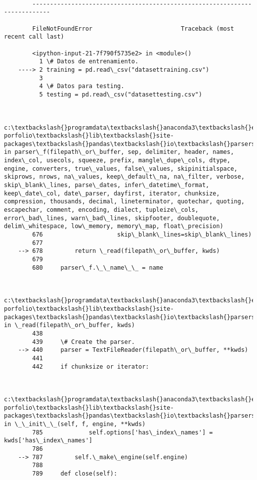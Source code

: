 \documentclass[11pt]{article}
\begin{document}
    \begin{Verbatim}[commandchars=\\\{\}]

        ---------------------------------------------------------------------------

        FileNotFoundError                         Traceback (most recent call last)

        <ipython-input-21-7f790f5735e2> in <module>()
          1 \# Datos de entrenamiento.
    ----> 2 training = pd.read\_csv("datasettraining.csv")
          3 
          4 \# Datos para testing.
          5 testing = pd.read\_csv("datasettesting.csv")
    

        c:\textbackslash{}programdata\textbackslash{}anaconda3\textbackslash{}envs\textbackslash{}ml-porfolio\textbackslash{}lib\textbackslash{}site-packages\textbackslash{}pandas\textbackslash{}io\textbackslash{}parsers.py in parser\_f(filepath\_or\_buffer, sep, delimiter, header, names, index\_col, usecols, squeeze, prefix, mangle\_dupe\_cols, dtype, engine, converters, true\_values, false\_values, skipinitialspace, skiprows, nrows, na\_values, keep\_default\_na, na\_filter, verbose, skip\_blank\_lines, parse\_dates, infer\_datetime\_format, keep\_date\_col, date\_parser, dayfirst, iterator, chunksize, compression, thousands, decimal, lineterminator, quotechar, quoting, escapechar, comment, encoding, dialect, tupleize\_cols, error\_bad\_lines, warn\_bad\_lines, skipfooter, doublequote, delim\_whitespace, low\_memory, memory\_map, float\_precision)
        676                     skip\_blank\_lines=skip\_blank\_lines)
        677 
    --> 678         return \_read(filepath\_or\_buffer, kwds)
        679 
        680     parser\_f.\_\_name\_\_ = name
    

        c:\textbackslash{}programdata\textbackslash{}anaconda3\textbackslash{}envs\textbackslash{}ml-porfolio\textbackslash{}lib\textbackslash{}site-packages\textbackslash{}pandas\textbackslash{}io\textbackslash{}parsers.py in \_read(filepath\_or\_buffer, kwds)
        438 
        439     \# Create the parser.
    --> 440     parser = TextFileReader(filepath\_or\_buffer, **kwds)
        441 
        442     if chunksize or iterator:
    

        c:\textbackslash{}programdata\textbackslash{}anaconda3\textbackslash{}envs\textbackslash{}ml-porfolio\textbackslash{}lib\textbackslash{}site-packages\textbackslash{}pandas\textbackslash{}io\textbackslash{}parsers.py in \_\_init\_\_(self, f, engine, **kwds)
        785             self.options['has\_index\_names'] = kwds['has\_index\_names']
        786 
    --> 787         self.\_make\_engine(self.engine)
        788 
        789     def close(self):
    


\end{Verbatim}
\end{document}
